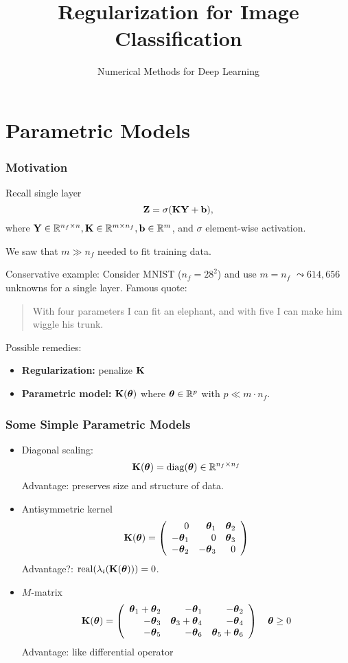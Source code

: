 \documentclass[12pt,fleqn,handout]{beamer}
\title[Reg Image Class]{Regularization for Image Classification}
\subtitle{Numerical Methods for Deep Learning}
\date{}
\begin{document}
\makebeamertitle

\section{Parametric Models} %
\label{sec:parametric_models}
\begin{frame}[fragile]\frametitle{Motivation}

Recall single layer
$$
	{\bf Z} = \sigma({\bf K}{\bf Y} + {\bf b}),
$$
where ${\bf Y} \in \mathbb{R}^{n_f\times n}, {\bf K} \in \mathbb{R}^{m \times n_f}, {\bf b}\in\mathbb{R}^m$, and $\sigma$ element-wise activation. 

\bigskip
\pause

We saw that $m \gg n_f$ needed to fit training data. 

Conservative example: Consider MNIST ($n_f = 28^2$) and use $m=n_f$ $\leadsto 614,656$ unknowns for a single layer. \pause Famous quote:

\begin{quote}
	With four parameters I can fit an elephant, and with five I can make him wiggle his trunk.
\end{quote}

\bigskip
\pause

Possible remedies:
\begin{itemize}
	\item \textbf{Regularization:} penalize ${\bf K}$ 
	\item \textbf{Parametric model:} ${\bf K}({\boldsymbol \theta})$ where ${\boldsymbol \theta}\in\mathbb{R}^p$ with $p\ll m\cdot n_f$.
\end{itemize}
\end{frame}


\begin{frame}\frametitle{Some Simple Parametric Models}
	
	\begin{itemize}
		\item Diagonal scaling:
		$$
			{\bf K}({\boldsymbol \theta}) = {\rm diag}({\boldsymbol \theta}) \in \mathbb{R}^{n_f\times n_f}
		$$
		Advantage: preserves size and structure of data.
		\pause
		\item Antisymmetric kernel
		$$
			{\bf K}({\boldsymbol \theta}) = \left(
				\begin{array}{rrr}
					0 & {\boldsymbol \theta}_1 & {\boldsymbol \theta}_2 \\
					-{\boldsymbol \theta}_1 & 0 & {\boldsymbol \theta}_3 \\
					-{\boldsymbol \theta}_2 & -{\boldsymbol \theta}_3 & 0
				\end{array}
			\right)
		$$
		Advantage?: ${\rm real}(\lambda_i({\bf K}({\boldsymbol \theta}))) = 0$. 
		\pause
		\item $M$-matrix
		$$
		{\bf K}({\boldsymbol \theta}) = \left(
				\begin{array}{rrr}
					{\boldsymbol \theta}_1+{\boldsymbol \theta}_2 & -{\boldsymbol \theta}_1 & -{\boldsymbol \theta}_2 \\
					-{\boldsymbol \theta}_3 & {\boldsymbol \theta}_3 + {\boldsymbol \theta}_4 & -{\boldsymbol \theta}_4 \\
					-{\boldsymbol \theta}_5 & -{\boldsymbol \theta}_6 & {\boldsymbol \theta}_5+{\boldsymbol \theta}_6
				\end{array}
			\right)
			\quad {\boldsymbol \theta} \geq 0
		$$
		Advantage: like differential operator
	\end{itemize}
\end{frame}
\end{document}
